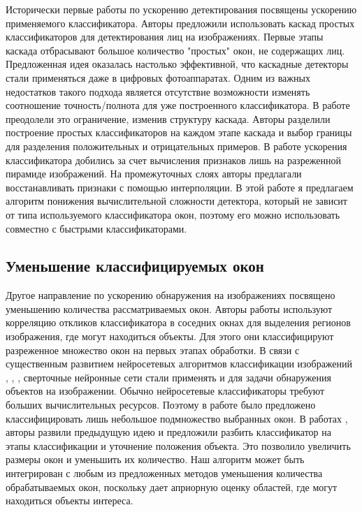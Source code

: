 Исторически первые работы по ускорению детектирования посвящены ускорению применяемого классификатора. Авторы \cite{viola2001rapid} предложили использовать каскад простых классификаторов для детектирования лиц на изображениях. Первые этапы каскада отбрасывают большое количество "простых" окон, не содержащих лиц. Предложенная идея оказалась настолько эффективной, что каскадные детекторы стали применяться даже в цифровых фотоаппаратах. Одним из важных недостатков такого подхода является отсутствие возможности изменять соотношение точность/полнота для уже построенного классификатора. В работе \cite{bourdev2005robust} преодолели это ограничение, изменив структуру каскада. Авторы разделили построение простых классификаторов на каждом этапе каскада и выбор границы для разделения положительных и отрицательных примеров. В работе \cite{dollar2010fastest} ускорения классификатора добились за счет вычисления признаков лишь на разреженной пирамиде изображений. На промежуточных слоях авторы предлагали восстанавливать признаки с помощью интерполяции. В этой работе я предлагаем алгоритм понижения вычислительной сложности детектора, который не зависит от типа используемого классификатора окон, поэтому его можно использовать совместно с быстрыми классификаторами.

\subsection{Уменьшение классифицируемых окон}

Другое направление по ускорению обнаружения на изображениях посвящено уменьшению количества рассматриваемых окон. Авторы работы \cite{dollar2012crosstalk} используют корреляцию откликов классификатора в соседних окнах для выделения регионов изображения, где могут находиться объекты. Для этого они классифицируют разреженное множество окон на первых этапах обработки. В связи с существенным развитием нейросетевых алгоритмов классификации изображений \cite{krizhevsky2012imagenet}, \cite{simonyan2014very}, \cite{he2015deep}, \cite{szegedy2015rethinking} сверточные нейронные сети стали применять и для задачи обнаружения объектов на изображении. Обычно нейросетевые классификаторы требуют больших вычислительных ресурсов. Поэтому в работе \cite{girshick2014rich} было предложено классифицировать лишь небольшое подмножество выбранных окон. В работах \cite{girshick2015fast}, \cite{ren2015faster} авторы развили предыдущую идею и предложили разбить классификатор на этапы классификации и уточнение положения объекта. Это позволило увеличить размеры окон и уменьшить их количество. Наш алгоритм может быть интегрирован с любым из предложенных методов уменьшения количества обрабатываемых окон, поскольку дает априорную оценку областей, где могут находиться объекты интереса.

